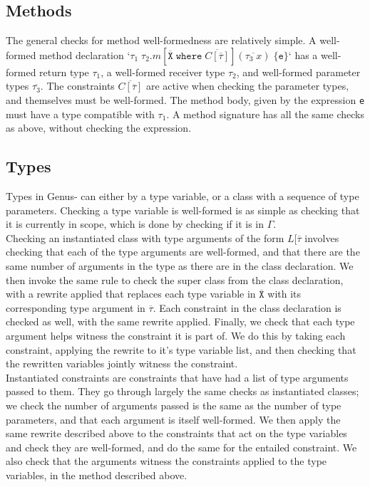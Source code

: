\subsection{Methods}

The general checks for method well-formedness are relatively simple. A well-formed method declaration `$\tau_1 \; \tau_2.m[\overline{\texttt{X}} \; \texttt{where} \; \overline{C[\overline{\tau}]}](\overline{\tau_3 \; x}) \; \{ \texttt{e} \}$` has a well-formed return type $\tau_1$, a well-formed receiver type $\tau_2$, and well-formed parameter types $\overline{\tau_3}$. The constraints $\overline{C[\overline{\tau}]}$ are active when checking the parameter types, and themselves must be well-formed. The method body, given by the expression \texttt{e} must have a type compatible with $\tau_1$. A method signature has all the same checks as above, without checking the expression.

\subsection{Types} \label{sec:wf-types}

Types in Genus- can either by a type variable, or a class with a sequence of type parameters. Checking a type variable is well-formed is as simple as checking that it is currently in scope, which is done by checking if it is in $\Gamma$. \\

Checking an instantiated class with type arguments of the form $L[\overline{\tau}$ involves checking that each of the type arguments are well-formed, and that there are the same number of arguments in the type as there are in the class declaration. We then invoke the same rule to check the super class from the class declaration, with a rewrite applied that replaces each type variable in $\overline{\texttt{X}}$ with its corresponding type argument in $\overline{\tau}$. Each constraint in the class declaration is checked as well, with the same rewrite applied. Finally, we check that each type argument helps witness the constraint it is part of. We do this by taking each constraint, applying the rewrite to it's type variable list, and then checking that the rewritten variables jointly witness the constraint. \\

Instantiated constraints are constraints that have had a list of type arguments passed to them. They go through largely the same checks as instantiated classes; we check the number of arguments passed is the same as the number of type parameters, and that each argument is itself well-formed. We then apply the same rewrite described above to the constraints that act on the type variables and check they are well-formed, and do the same for the entailed constraint. We also check that the arguments witness the constraints applied to the type variables, in the method described above.

